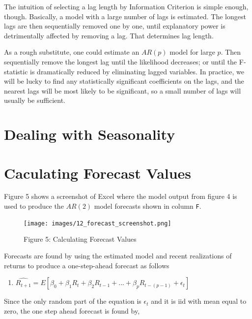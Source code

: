 \documentclass[
  letterpaper,
  DIV=11,
  numbers=noendperiod]{scrreprt}
\providecommand{\tightlist}{%
  \setlength{\itemsep}{0pt}\setlength{\parskip}{0pt}}\usepackage{longtable,booktabs,array}
\begin{document}
The intuition of selecting a lag length by Information Criterion is
simple enough, though. Basically, a model with a large number of lags is
estimated. The longest lags are then sequentially removed one by one,
until explanatory power is detrimentally affected by removing a lag.
That determines lag length.

As a rough substitute, one could estimate an \(AR(p)\) model for large
\(p\). Then sequentially remove the longest lag until the likelihood
decreases; or until the F-statistic is dramatically reduced by
eliminating lagged variables. In practice, we will be lucky to find any
statistically significant coefficients on the lags, and the nearest lags
will be most likely to be significant, so a small number of lags will
usually be sufficient.

\section{Dealing with Seasonality}\label{dealing-with-seasonality}

\section{Caculating Forecast Values}\label{caculating-forecast-values}

Figure 5 shows a screenshot of Excel where the model output from figure
4 is used to produce the \(AR(2)\) model forecasts shown in column
\texttt{F}.

\begin{figure}[H]

{\centering \texttt{[image: images/12\_forecast\_screenshot.png]}

}

\caption{Figure 5: Calculating Forecast Values}

\end{figure}%

Forecasts are found by using the estimated model and recent realizations
of returns to produce a one-step-ahead forecast as follows

\begin{enumerate}
\def\labelenumi{\arabic{enumi}.}
\setcounter{enumi}{2}
\tightlist
\item
  \(\hat{R_{t+1}} = E[\beta_0 + \beta_1R_{t} + \beta_2R_{t-1}+ ... + \beta_{p}R_{t-(p-1)} + \epsilon_t]\)
\end{enumerate}

Since the only random part of the equation is \(\epsilon_t\) and it is
iid with mean equal to zero, the one step ahead forecast is found by,
\end{document}
